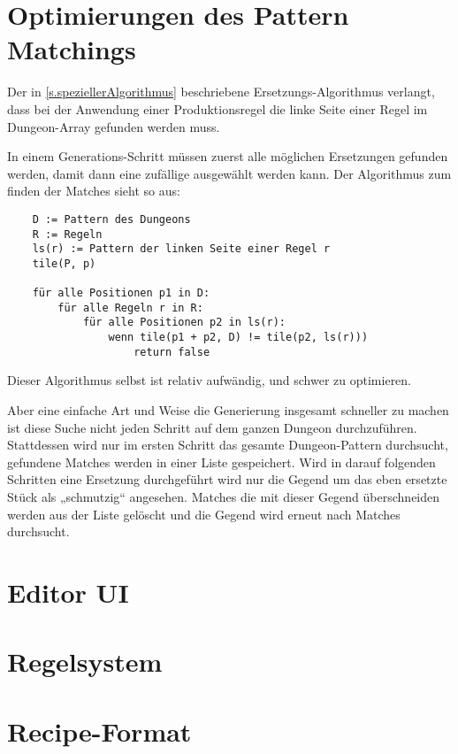 \section{Optimierungen des Pattern Matchings}

Der in \ref{s.speziellerAlgorithmus} beschriebene Ersetzungs-Algorithmus verlangt, dass bei der Anwendung einer Produktionsregel die linke Seite einer Regel im Dungeon-Array gefunden werden muss.

In einem Generations-Schritt müssen zuerst alle möglichen Ersetzungen gefunden werden, damit dann eine zufällige ausgewählt werden kann. Der Algorithmus zum finden der Matches sieht so aus:

\begin{verbatim}
    D := Pattern des Dungeons
    R := Regeln
    ls(r) := Pattern der linken Seite einer Regel r
    tile(P, p)

    für alle Positionen p1 in D:
        für alle Regeln r in R:
            für alle Positionen p2 in ls(r):
                wenn tile(p1 + p2, D) != tile(p2, ls(r)))
                    return false
\end{verbatim}


Dieser Algorithmus selbst ist relativ aufwändig, und schwer zu optimieren. 

Aber eine einfache Art und Weise die Generierung insgesamt schneller zu machen ist diese Suche nicht jeden Schritt auf dem ganzen Dungeon durchzuführen. Stattdessen wird nur im ersten Schritt das gesamte Dungeon-Pattern durchsucht, gefundene Matches werden in einer Liste gespeichert. Wird in darauf folgenden Schritten eine Ersetzung durchgeführt wird nur die Gegend um das eben ersetzte Stück als „schmutzig“ angesehen. Matches die mit dieser Gegend überschneiden werden aus der Liste gelöscht und die Gegend wird erneut nach Matches durchsucht. 


\section{Editor UI}\label{s.editorUI}

\section{Regelsystem}
\section{Recipe-Format}\label{s.recipeFormat}

